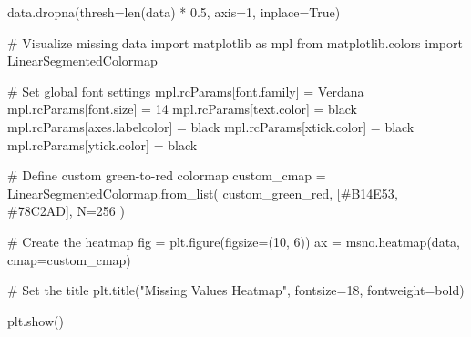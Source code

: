 \documentclass[
  letterpaper,
  DIV=11,
  numbers=noendperiod]{scrartcl}
\newenvironment{Shaded}{\begin{snugshade}}{\end{snugshade}}
\newcommand{\BuiltInTok}[1]{\textcolor[rgb]{0.00,0.23,0.31}{#1}}
\newcommand{\CommentTok}[1]{\textcolor[rgb]{0.37,0.37,0.37}{#1}}
\newcommand{\DecValTok}[1]{\textcolor[rgb]{0.68,0.00,0.00}{#1}}
\newcommand{\FloatTok}[1]{\textcolor[rgb]{0.68,0.00,0.00}{#1}}
\newcommand{\ImportTok}[1]{\textcolor[rgb]{0.00,0.46,0.62}{#1}}
\newcommand{\NormalTok}[1]{\textcolor[rgb]{0.00,0.23,0.31}{#1}}
\newcommand{\OperatorTok}[1]{\textcolor[rgb]{0.37,0.37,0.37}{#1}}
\newcommand{\StringTok}[1]{\textcolor[rgb]{0.13,0.47,0.30}{#1}}
\newcommand{\VariableTok}[1]{\textcolor[rgb]{0.07,0.07,0.07}{#1}}
\begin{document}
\begin{Shaded}
\begin{Highlighting}[]
\NormalTok{data.dropna(thresh}\OperatorTok{=}\BuiltInTok{len}\NormalTok{(data) }\OperatorTok{*} \FloatTok{0.5}\NormalTok{, axis}\OperatorTok{=}\DecValTok{1}\NormalTok{, inplace}\OperatorTok{=}\VariableTok{True}\NormalTok{)}

\CommentTok{\# Visualize missing data}
\ImportTok{import}\NormalTok{ matplotlib }\ImportTok{as}\NormalTok{ mpl}
\ImportTok{from}\NormalTok{ matplotlib.colors }\ImportTok{import}\NormalTok{ LinearSegmentedColormap}

\CommentTok{\# Set global font settings}
\NormalTok{mpl.rcParams[}\StringTok{\textquotesingle{}font.family\textquotesingle{}}\NormalTok{] }\OperatorTok{=} \StringTok{\textquotesingle{}Verdana\textquotesingle{}}
\NormalTok{mpl.rcParams[}\StringTok{\textquotesingle{}font.size\textquotesingle{}}\NormalTok{] }\OperatorTok{=} \DecValTok{14}
\NormalTok{mpl.rcParams[}\StringTok{\textquotesingle{}text.color\textquotesingle{}}\NormalTok{] }\OperatorTok{=} \StringTok{\textquotesingle{}black\textquotesingle{}}
\NormalTok{mpl.rcParams[}\StringTok{\textquotesingle{}axes.labelcolor\textquotesingle{}}\NormalTok{] }\OperatorTok{=} \StringTok{\textquotesingle{}black\textquotesingle{}}
\NormalTok{mpl.rcParams[}\StringTok{\textquotesingle{}xtick.color\textquotesingle{}}\NormalTok{] }\OperatorTok{=} \StringTok{\textquotesingle{}black\textquotesingle{}}
\NormalTok{mpl.rcParams[}\StringTok{\textquotesingle{}ytick.color\textquotesingle{}}\NormalTok{] }\OperatorTok{=} \StringTok{\textquotesingle{}black\textquotesingle{}}

\CommentTok{\# Define custom green{-}to{-}red colormap}
\NormalTok{custom\_cmap }\OperatorTok{=}\NormalTok{ LinearSegmentedColormap.from\_list(}
    \StringTok{\textquotesingle{}custom\_green\_red\textquotesingle{}}\NormalTok{, [}\StringTok{\textquotesingle{}\#B14E53\textquotesingle{}}\NormalTok{, }\StringTok{\textquotesingle{}\#78C2AD\textquotesingle{}}\NormalTok{], N}\OperatorTok{=}\DecValTok{256}
\NormalTok{)}

\CommentTok{\# Create the heatmap}
\NormalTok{fig }\OperatorTok{=}\NormalTok{ plt.figure(figsize}\OperatorTok{=}\NormalTok{(}\DecValTok{10}\NormalTok{, }\DecValTok{6}\NormalTok{))}
\NormalTok{ax }\OperatorTok{=}\NormalTok{ msno.heatmap(data, cmap}\OperatorTok{=}\NormalTok{custom\_cmap)}

\CommentTok{\# Set the title}
\NormalTok{plt.title(}\StringTok{"Missing Values Heatmap"}\NormalTok{, fontsize}\OperatorTok{=}\DecValTok{18}\NormalTok{, fontweight}\OperatorTok{=}\StringTok{\textquotesingle{}bold\textquotesingle{}}\NormalTok{)}

\NormalTok{plt.show()}
\end{Highlighting}
\end{Shaded}
\end{document}
